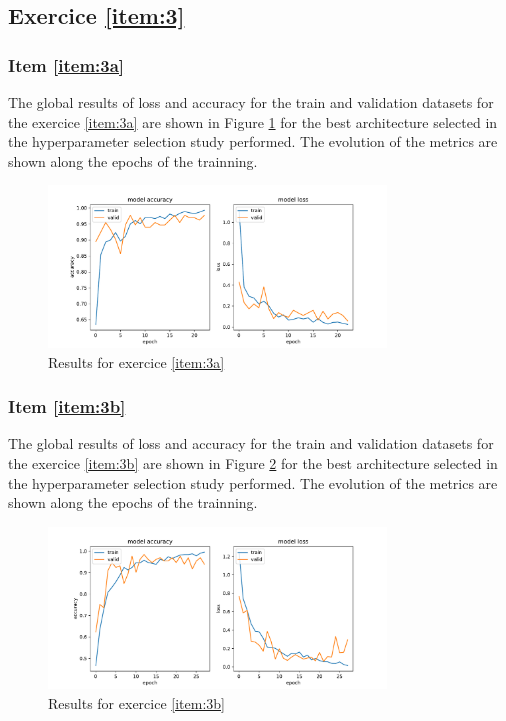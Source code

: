 \documentclass[10pt, a4paper]{article}
\begin{document}
\newpage

\subsection{Exercice \ref{item:3}}

\subsubsection{Item \ref{item:3a}}

The global results of loss and accuracy for the train and validation datasets for the exercice \ref{item:3a} are shown in Figure \ref{fig:e3a} for the best architecture selected 
in the hyperparameter selection study performed. The evolution of the metrics are shown along the epochs of the trainning.

\begin{figure}[htpb]
  \centering
  \includegraphics[width=0.8\textwidth]{images/3.a.pdf}
  \caption{Results for exercice \ref{item:3a}}
  \label{fig:e3a}
\end{figure}

\subsubsection{Item \ref{item:3b}}

The global results of loss and accuracy for the train and validation datasets for the exercice \ref{item:3b} are shown in Figure \ref{fig:e3b} for the best architecture selected 
in the hyperparameter selection study performed. The evolution of the metrics are shown along the epochs of the trainning.

\begin{figure}[htpb]
  \centering
  \includegraphics[width=0.8\textwidth]{images/3.b.pdf}
  \caption{Results for exercice \ref{item:3b}}
  \label{fig:e3b}
\end{figure}
\end{document}
